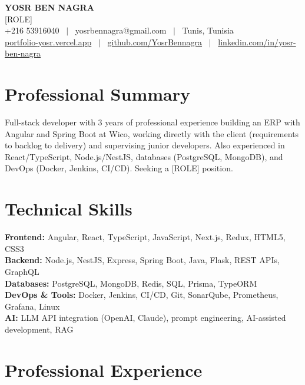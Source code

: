 \documentclass[10pt,a4paper]{article}
\begin{document}
\begin{center}
  {\LARGE\bfseries YOSR BEN NAGRA}\\[3pt]
  {\normalsize [ROLE]}\\[4pt]  %
  {\small
    +216 53916040 \ $\vert$ \
    yosrbennagra@gmail.com \ $\vert$ \
    Tunis, Tunisia\\
    \href{https://portfolio-yosr.vercel.app/en}{portfolio-yosr.vercel.app} \ $\vert$ \
    \href{https://github.com/YosrBennagra}{github.com/YosrBennagra} \ $\vert$ \
    \href{https://www.linkedin.com/in/yosr-ben-nagra/}{linkedin.com/in/yosr-ben-nagra}
  }
\end{center}

\section*{Professional Summary}
\small
Full-stack developer with 3 years of professional experience building an ERP with Angular and
Spring Boot at Wico, working directly with the client (requirements to backlog to delivery) and
supervising junior developers. Also experienced in React/TypeScript, Node.js/NestJS, databases
(PostgreSQL, MongoDB), and DevOps (Docker, Jenkins, CI/CD). Seeking a [ROLE] position.

\section*{Technical Skills}
\small
\textbf{Frontend:} Angular, React, TypeScript, JavaScript, Next.js, Redux, HTML5, CSS3\\
\textbf{Backend:} Node.js, NestJS, Express, Spring Boot, Java, Flask, REST APIs, GraphQL\\
\textbf{Databases:} PostgreSQL, MongoDB, Redis, SQL, Prisma, TypeORM\\
\textbf{DevOps \& Tools:} Docker, Jenkins, CI/CD, Git, SonarQube, Prometheus, Grafana, Linux\\
\textbf{AI:} LLM API integration (OpenAI, Claude), prompt engineering, AI-assisted development, RAG

\section*{Professional Experience}
\small
\end{document}
